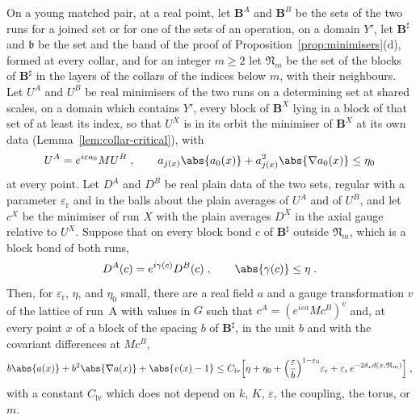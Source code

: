 

\begin{lemma}\label{lem:link-values}
On a young matched pair, at a real point, let $\mathbf B^A$ and $\mathbf B^B$ be the sets of the two runs for a joined set or for one of the sets of an operation, on a domain $Y'$, let $\mathbf B^\sharp$ and $\mathfrak b$ be the set and the band of the proof of Proposition~\ref{prop:minimisers}(d), formed at every collar, and for an integer $m \geq 2$ let $\mathfrak N_m$ be the set of the blocks of $\mathbf B^\sharp$ in the layers of the collars of the indices below $m$, with their neighbours. Let $U^A$ and $U^B$ be real minimisers of the two runs on a determining set at shared scales, on a domain which contains $Y'$, every block of $\mathbf B^X$ lying in a block of that set of at least its index, so that $U^X$ is in its orbit the minimiser of $\mathbf B^X$ at its own data (Lemma~\ref{lem:collar-critical}), with
\[
    U^A = e^{i\varepsilon a_0}MU^B\;,
    \qquad
    a_{j(x)}\abs{a_0(x)} + a_{j(x)}^2\abs{\nabla a_0(x)} \leq \eta_0
\]
at every point. Let $D^A$ and $D^B$ be real plain data of the two sets, regular with a parameter $\varepsilon_{\mathrm r}$ and in the balls \cite[(172)]{BalabanVAR} about the plain averages of $U^A$ and of $U^B$, and let $c^X$ be the minimiser of run $X$ with the plain averages $D^X$ in the axial gauge relative to $U^X$. Suppose that on every block bond $c$ of $\mathbf B^\sharp$ outside $\mathfrak N_m$, which is a block bond of both runs,
\[
    D^A(c) = e^{i\gamma(c)}D^B(c)\;,
    \qquad
    \abs{\gamma(c)} \leq \eta\;.
\]
Then, for $\varepsilon_{\mathrm r}$, $\eta$, and $\eta_0$ small, there are a real field $a$ and a gauge transformation $v$ of the lattice of run~A with values in $G$ such that $c^A = (e^{i\varepsilon a}Mc^B)^v$ and, at every point $x$ of a block of the spacing $b$ of $\mathbf B^\sharp$, in the unit $b$ and with the covariant differences at $Mc^B$,
\[
    b\abs{a(x)} + b^2\abs{\nabla a(x)} + \abs{v(x) - 1} \leq C_{\mathrm{lv}}\Bigl[\eta + \eta_0 + \Bigl(\frac{\varepsilon}{b}\Bigr)^{1-\varepsilon_0}\varepsilon_{\mathrm r} + \varepsilon_{\mathrm r}\,e^{-2\delta_\star d(x,\mathfrak N_m)}\Bigr]\;,
\]
with a constant $C_{\mathrm{lv}}$ which does not depend on $k$, $K$, $\varepsilon$, the coupling, the torus, or $m$.
\end{lemma}

